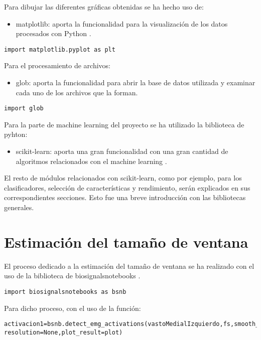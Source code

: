 Para dibujar las diferentes gráficas obtenidas se ha hecho uso de:
\begin{itemize}
\item matplotlib: aporta la funcionalidad para la visualización de los datos procesados con Python \cite{matplotlib}.
\end{itemize}

\begin{lstlisting}
import matplotlib.pyplot as plt
\end{lstlisting}

Para el procesamiento de archivos:
\begin{itemize}
\item glob: aporta la funcionalidad para abrir la base de datos utilizada y examinar cada uno de los archivos que la forman.
\end{itemize}

\begin{lstlisting}
import glob
\end{lstlisting}

Para la parte de machine learning del proyecto se ha utilizado la biblioteca de pyhton:
\begin{itemize}
\item scikit-learn: aporta una gran funcionalidad con una gran cantidad de algoritmos relacionados con el machine learning \cite{scikit}.
\end{itemize}


El resto de módulos relacionados con scikit-learn, como por ejemplo, para los clasificadores, selección de características y rendimiento, serán explicados en sus correspondientes secciones. Esto fue una breve introducción con las bibliotecas generales.


\section{Estimación del tamaño de ventana}
El proceso dedicado a la estimación del tamaño de ventana se ha realizado con el uso de la biblioteca de biosignalsnotebooks \cite{biosignal}.

\begin{lstlisting}
import biosignalsnotebooks as bsnb
\end{lstlisting}

Para dicho proceso, con el uso de la función:
\begin{lstlisting}
activacion1=bsnb.detect_emg_activations(vastoMedialIzquierdo,fs,smooth_level=smooth,threshold_level=threshold,time_units=False,volts=False, resolution=None,plot_result=plot)
\end{lstlisting}

